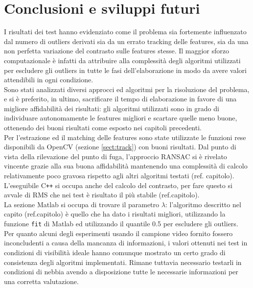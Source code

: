 \documentclass[12pt]{report}
\begin{document}
\chapter{Conclusioni e sviluppi futuri}

\noindent I risultati dei test hanno evidenziato come il problema sia fortemente influenzato dal numero di outliers derivati sia da un errato tracking delle features, sia da una non perfetta variazione del contrasto sulle features stesse. Il maggior sforzo computazionale \`e infatti da attribuire alla complessit\`a degli algoritmi utilizzati per escludere gli outliers in tutte le fasi dell'elaborazione in modo da avere valori attendibili in ogni condizione.\\

\noindent Sono stati analizzati diversi approcci ed algoritmi per la risoluzione del problema, e si \`e preferito, in ultimo, sacrificare il tempo di elaborazione in favore di una migliore affidabilit\`a dei risultati: gli algoritmi utilizzati sono in grado di individuare autonomamente le features migliori e scartare quelle meno buone, ottenendo dei buoni risultati come esposto nei capitoli precedenti.\\

\noindent Per l'estrazione ed il matching delle features sono state utilizzate le funzioni rese disponibili da OpenCV (sezione \ref{sect:track}) con buoni risultati. Dal punto di vista della rilevazione del punto di fuga, l'approccio RANSAC si \`e rivelato vincente grazie alla sua buona affidabilit\`a mantenendo una complessit\`a di calcolo relativamente poco gravosa rispetto agli altri algoritmi testati (ref. capitolo). L'eseguibile C\verb|++| si occupa anche del calcolo del contrasto, per fare questo si avvale di RMS che nei test \`e risultato il pi\`u stabile (ref.capitolo). \\

\noindent La sezione Matlab si occupa di trovare il parametro $\lambda$: l'algoritmo descritto nel capito (ref.capitolo) \`e quello che ha dato i risultati migliori, utilizzando la funzione \verb|fit| di Matlab ed utilizzando il quantile 0.5 per escludere gli outliers.\\

\noindent Per quanto alcuni degli esperimenti usando il campione video fornito fossero inconcludenti a causa della mancanza di informazioni, i valori ottenuti nei test in condizioni di visibilit\`a ideale hanno comunque mostrato un certo grado di consistenza degli algoritmi implementati. Rimane tuttavia necessario testarli in condizioni di nebbia avendo a disposizione tutte le necessarie informazioni per una corretta valutazione.\\
\end{document}
